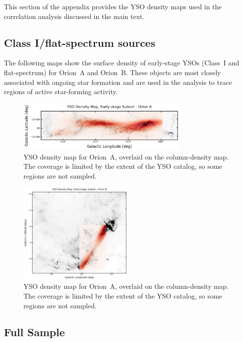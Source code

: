 This section of the appendix provides the YSO density maps used in the correlation analysis discussed in the main text.  

\subsection{Class I/flat-spectrum sources}

The following maps show the surface density of early‑stage YSOs (Class~I and flat‑spectrum) for Orion~A and Orion~B.  
These objects are most closely associated with ongoing star formation and are used in the analysis to trace regions of active star‑forming activity.

\begin{figure}[h]
    \centering
    \includegraphics[width=0.75\textwidth]{figures/YSOs_early_stage_density_Orion_A.png}
    \caption{YSO density map for Orion~A, overlaid on the column-density map. The coverage is limited by the extent of the YSO catalog, so some regions are not sampled.}
    \label{fig:YSOs_density_Map_A_early_stages}
\end{figure}

\begin{figure}[h]
    \centering
    \includegraphics[width=0.5\textwidth]{figures/YSOs_early_stage_density_Orion_B.png}
    \caption{YSO density map for Orion~A, overlaid on the column-density map. The coverage is limited by the extent of the YSO catalog, so some regions are not sampled.}
    \label{fig:YSOs_density_Map_B_early_stages}
\end{figure}

\subsection{Full Sample}

